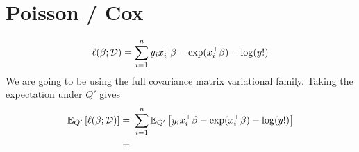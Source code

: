 \newpage
\section{Poisson / Cox}

\begin{equation}
    \ell(\beta; \mathcal{D}) = \sum_{i=1}^n y_i x_i^\top \beta - \exp(x_i^\top \beta) - \log(y!)
\end{equation}
We are going to be using the full covariance matrix variational family. Taking the expectation under $Q'$ gives
\begin{align}
    \mathbb{E}_{Q'} \left[ \ell (\beta; \mathcal{D}) \right] 
    =&\ \sum_{i=1}^n \mathbb{E}_{Q'} \left[ 
	y_i x_i^\top \beta - \exp(x_i^\top \beta) - \log(y!)
    \right]
    \\
    \nonumber
    =&\
\end{align}


